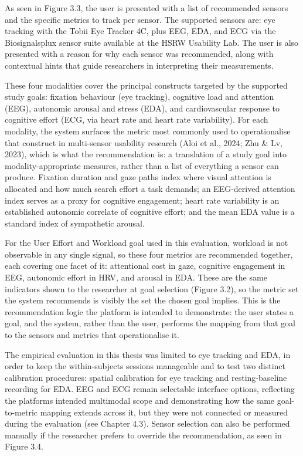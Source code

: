 \documentclass[
]{article}
\begin{document}
As seen in Figure 3.3, the user is presented with a list of recommended sensors and the specific metrics to track per sensor. The supported sensors are: eye tracking with the Tobii Eye Tracker 4C, plus EEG, EDA, and ECG via the Biosignalsplux sensor suite available at the HSRW Usability Lab. The user is also presented with a reason for why each sensor was recommended, along with contextual hints that guide researchers in interpreting their measurements.

These four modalities cover the principal constructs targeted by the supported study goals: fixation behaviour (eye tracking), cognitive load and attention (EEG), autonomic arousal and stress (EDA), and cardiovascular response to cognitive effort (ECG, via heart rate and heart rate variability). For each modality, the system surfaces the metric most commonly used to operationalise that construct in multi-sensor usability research (Aloi et al., 2024; Zhu \& Lv, 2023), which is what the recommendation is: a translation of a study goal into modality-appropriate measures, rather than a list of everything a sensor can produce. Fixation duration and gaze paths index where visual attention is allocated and how much search effort a task demands; an EEG-derived attention index serves as a proxy for cognitive engagement; heart rate variability is an established autonomic correlate of cognitive effort; and the mean EDA value is a standard index of sympathetic arousal.

For the User Effort and Workload goal used in this evaluation, workload is not observable in any single signal, so these four metrics are recommended together, each covering one facet of it: attentional cost in gaze, cognitive engagement in EEG, autonomic effort in HRV, and arousal in EDA. These are the same indicators shown to the researcher at goal selection (Figure 3.2), so the metric set the system recommends is visibly the set the chosen goal implies. This is the recommendation logic the platform is intended to demonstrate: the user states a goal, and the system, rather than the user, performs the mapping from that goal to the sensors and metrics that operationalise it.

The empirical evaluation in this thesis was limited to eye tracking and EDA, in order to keep the within-subjects sessions manageable and to test two distinct calibration procedures: spatial calibration for eye tracking and resting-baseline recording for EDA. EEG and ECG remain selectable interface options, reflecting the platform\textquotesingle s intended multimodal scope and demonstrating how the same goal-to-metric mapping extends across it, but they were not connected or measured during the evaluation (see Chapter 4.3). Sensor selection can also be performed manually if the researcher prefers to override the recommendation, as seen in Figure 3.4.
\end{document}
